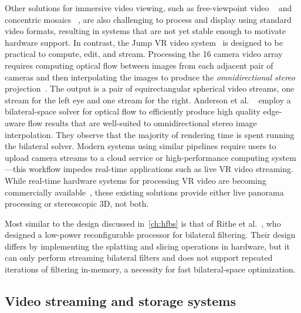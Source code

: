 Other solutions for immersive video viewing, such as free-viewpoint video ~\cite{carranza2003free} and concentric mosaics ~\cite{shum2005virtual}, are also challenging to process and display using standard video formats, resulting in systems that are not yet stable enough to motivate hardware support.
In contrast, the Jump VR video system~\cite{googlejump} is designed to be practical to compute, edit, and stream.
Processing the 16 camera video array requires computing optical flow between images from each adjacent pair of cameras and then interpolating the images to produce the \emph{omnidirectional stereo} projection~\cite{peleg2001}.
The output is a pair of equirectangular spherical video streams, one stream for the left eye and one stream for the right.
Anderson et al. ~\cite{googlejump} employ a bilateral-space solver for optical flow to efficiently produce high quality edge-aware flow results that are well-suited to omnidirectional stereo image interpolation.
They observe that the majority of rendering time is spent running the bilateral solver.
Modern systems using similar pipelines require users to upload camera streams to a cloud service or high-performance computing system---this workflow impedes real-time applications such as live VR video streaming.
While real-time hardware systems for processing VR video are becoming commercially available~\cite{gopro,sphere,vahana}, these existing solutions provide either live panorama processing or stereoscopic 3D, not both.

Most similar to the design discussed in~\ref{ch:hfbs} is that of Rithe et al.~\cite{bilat_isscc}, who designed a low-power reconfigurable processor for bilateral filtering.
Their design differs by implementing the splatting and slicing operations in hardware, but it can only perform streaming bilateral filters and does not support repeated iterations of filtering in-memory, a necessity for fast bilateral-space optimization.

\subsection{Video streaming and storage systems}
\label{sec:related:streaming}

